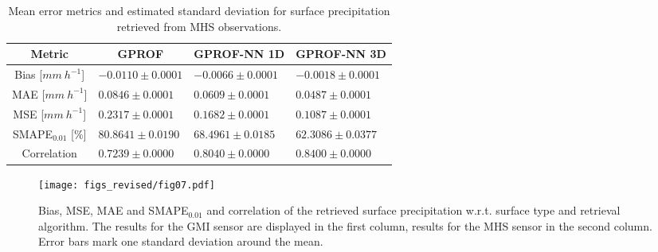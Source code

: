 \documentclass[journal abbreviation, manuscript]{copernicus}
\begin{document}
\begin{table}[hbpt!]
  \caption{Mean error metrics and estimated standard deviation for surface
    precipitation retrieved from MHS observations.}
  \label{tab:metrics_mhs}
  \begin{tabular}{|c||p{3.5cm}|p{3.5cm}|p{3.5cm}|}
    \hline
    Metric &
    \multicolumn{1}{|c}{GPROF} &
    \multicolumn{1}{|c}{GPROF-NN 1D} &
    \multicolumn{1}{|c|}{GPROF-NN 3D} \\
    \hline\hline
    Bias \hfill [$\unit{mm\ h^{-1}}$] & \hfill $ -0.0110 \pm 0.0001$ &\hfill $ -0.0066 \pm 0.0001$ &\hfill $ -0.0018 \pm 0.0001$ \\
    MAE \hfill [$\unit{mm\ h^{-1}}$] & \hfill $  0.0846 \pm 0.0001$ &\hfill $  0.0609 \pm 0.0001$ &\hfill $  0.0487 \pm 0.0001$ \\
    MSE \hfill [$\unit{mm\ h^{-1}}$] & \hfill $  0.2317 \pm 0.0001$ &\hfill $  0.1682 \pm 0.0001$ &\hfill $  0.1087 \pm 0.0001$ \\
    SMAPE$_{0.01}$ \hfill [$\unit{\%}$] & \hfill $ 80.8641 \pm 0.0190$ &\hfill $ 68.4961 \pm 0.0185$ &\hfill $ 62.3086 \pm 0.0377$ \\
    Correlation & \hfill $  0.7239 \pm 0.0000$ &\hfill $  0.8040 \pm 0.0000$ &\hfill $  0.8400 \pm 0.0000$ \\
    \hline
  \end{tabular}
\end{table}

\begin{figure}[hbpt]
  \centering
  \texttt{[image: figs\_revised/fig07.pdf]}
  \caption{
    Bias, MSE, MAE and SMAPE$_{0.01}$ and correlation of the retrieved surface
    precipitation w.r.t. surface type and retrieval algorithm. The results for
    the GMI sensor are displayed in the first column, results for the MHS sensor
    in the second column. Error bars mark one standard deviation around the
    mean.}
  \label{fig:results_surface_types}
\end{figure}
\end{document}
